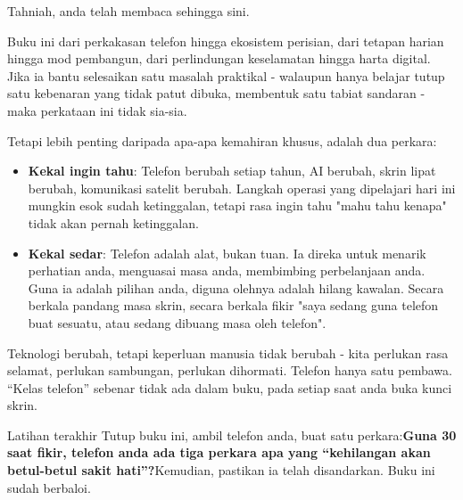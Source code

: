 
Tahniah, anda telah membaca sehingga sini.

Buku ini dari perkakasan telefon hingga ekosistem perisian, dari tetapan harian hingga mod pembangun, dari perlindungan keselamatan hingga harta digital. Jika ia bantu selesaikan satu masalah praktikal - walaupun hanya belajar tutup satu kebenaran yang tidak patut dibuka, membentuk satu tabiat sandaran - maka perkataan ini tidak sia-sia.

Tetapi lebih penting daripada apa-apa kemahiran khusus, adalah dua perkara:

\begin{itemize}
  \item \textbf{Kekal ingin tahu}: Telefon berubah setiap tahun, AI berubah, skrin lipat berubah, komunikasi satelit berubah. Langkah operasi yang dipelajari hari ini mungkin esok sudah ketinggalan, tetapi rasa ingin tahu "mahu tahu kenapa" tidak akan pernah ketinggalan.
  \item \textbf{Kekal sedar}: Telefon adalah alat, bukan tuan. Ia direka untuk menarik perhatian anda, menguasai masa anda, membimbing perbelanjaan anda. Guna ia adalah pilihan anda, diguna olehnya adalah hilang kawalan. Secara berkala pandang masa skrin, secara berkala fikir "saya sedang guna telefon buat sesuatu, atau sedang dibuang masa oleh telefon".
\end{itemize}

Teknologi berubah, tetapi keperluan manusia tidak berubah - kita perlukan rasa selamat, perlukan sambungan, perlukan dihormati. Telefon hanya satu pembawa. “Kelas telefon” sebenar tidak ada dalam buku, pada setiap saat anda buka kunci skrin.

\begin{tcbpractice}{Latihan terakhir}
Tutup buku ini, ambil telefon anda, buat satu perkara:\textbf{Guna 30 saat fikir, telefon anda ada tiga perkara apa yang “kehilangan akan betul-betul sakit hati”?}Kemudian, pastikan ia telah disandarkan. Buku ini sudah berbaloi.

\end{tcbpractice}
